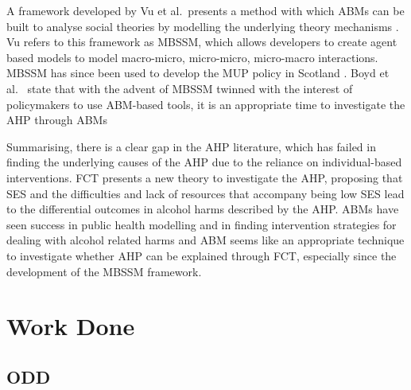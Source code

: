 A framework developed by Vu et al.~presents a method with which \ac{ABM}s can be built to analyse social theories by modelling the underlying theory mechanisms \cite{MBSSM}. Vu refers to this framework as \ac{MBSSM}, which allows developers to create agent based models to model macro-micro, micro-micro, micro-macro interactions. \ac{MBSSM} has since been used to develop the \ac{MUP} policy in Scotland \cite{mbssmCommentary, scotlandMUP}. Boyd et al.~ state that with the advent of \ac{MBSSM} twinned with the interest of policymakers to use \ac{ABM}-based tools, it is an appropriate time to investigate the \ac{AHP} through \ac{ABM}s \cite{Boyd2022, sipherIntro}

Summarising, there is a clear gap in the \ac{AHP} literature, which has failed in finding the underlying causes of the \ac{AHP} due to the reliance on individual-based interventions. \ac{FCT} presents a new theory to investigate the \ac{AHP},  proposing that \ac{SES} and the difficulties and lack of resources that accompany being low \ac{SES} lead to the differential outcomes in alcohol harms described by the \ac{AHP}. \ac{ABM}s have seen success in public health modelling and in finding intervention strategies for dealing with alcohol related harms and \ac{ABM} seems like an appropriate technique to investigate whether \ac{AHP} can be explained through \ac{FCT}, especially since the development of the \ac{MBSSM} framework. 









\section{Work Done}




\subsection{ODD}

